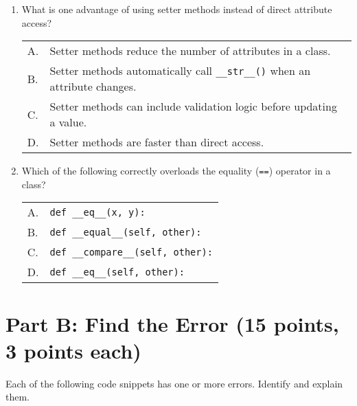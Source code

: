 \documentclass[11pt]{article}
\begin{document}
\begin{enumerate}[label=\arabic*.]
    \item What is one advantage of using setter methods instead of direct attribute access? \\
    \begin{tabular}{ll}
        A. & Setter methods reduce the number of attributes in a class. \\
        B. & Setter methods automatically call \verb|__str__()| when an attribute changes. \\
        C. & Setter methods can include validation logic before updating a value. \\
        D. & Setter methods are faster than direct access.
    \end{tabular}

    \item Which of the following correctly overloads the equality (\verb|==|) operator in a class? \\
    \begin{tabular}{ll}
        A. & \verb|def __eq__(x, y):| \\
        B. & \verb|def __equal__(self, other):| \\
        C. & \verb|def __compare__(self, other):| \\
        D. & \verb|def __eq__(self, other):|
    \end{tabular}
\end{enumerate}

\newpage

\section*{Part B: Find the Error (15 points, 3 points each)}
Each of the following code snippets has one or more errors. Identify and explain them.
\end{document}
